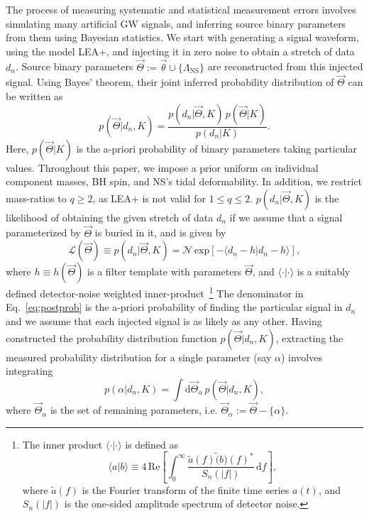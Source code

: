 \documentclass[aps,prd,amsmath,floats,floatfix, twocolumn,
superscriptaddress,nofootinbib,showpacs]{revtex4-1}
\newcommand{\D}{\mathrm{d}}
\newcommand{\lambdans}{\Lambda_\mathrm{NS}}
\newcommand{\LL}{\mathcal{L}}
\begin{document}
The process of measuring systematic and statistical measurement errors
involves simulating many artificial GW signals, and inferring source binary
parameters from them using Bayesian statistics.
We start with generating a signal waveform, using the model LEA+, and injecting
it in zero noise to obtain a stretch of data $d_n$. Source binary parameters
$\vec{\Theta}:=\vec{\theta}\cup\{\lambdans\}$ are reconstructed from this
injected signal. Using Bayes' theorem, their joint inferred probability
distribution of $\vec{\Theta}$ can be written	 as
\begin{equation}\label{eq:postprob}
 p(\vec{\Theta} | d_n, K) = \dfrac{p(d_n|\vec{\Theta}, K)\,p(\vec{\Theta} | K)}{p(d_n|K)}.
\end{equation}
Here, $p(\vec{\Theta} | K)$ is the a-priori probability of binary parameters
taking particular values. Throughout this paper, we impose a prior uniform on
individual component masses, BH spin, and NS's tidal deformability. In
addition, we restrict mass-ratios to $q\geq 2$, as LEA+ is not valid for 
$1\leq q\leq 2$. $p(d_n|\vec{\Theta}, K)$ is the
likelihood of obtaining the given stretch of data $d_n$ if we assume that a
signal parameterized by $\vec{\Theta}$ is buried in it, and is given by
\begin{equation}\label{eq:likelihood}
 \LL(\vec{\Theta}) \equiv p(d_n| \vec{\Theta}, K) = \mathcal{N}\, \mathrm{exp}[- \langle d_n - h | d_n - h\rangle ],
\end{equation}
where $h\equiv h(\vec{\Theta})$ is a filter template with parameters 
$\vec{\Theta}$, and $\langle\cdot|\cdot\rangle$ is a suitably defined
detector-noise weighted inner-product~\footnote{The inner product
$\langle\cdot|\cdot\rangle$  is defined as
\begin{equation}
\langle a|b\rangle \equiv 4\,\mathrm{Re}\left[\int_0^\infty \dfrac{\tilde{a}(f) \tilde(b)(f)^*}{S_n(|f|)}\,\D f\right],
\end{equation}
where $\tilde{a}(f)$ is the Fourier transform of the finite time series $a(t)$,
and $S_n(|f|)$ is the one-sided amplitude spectrum of detector noise.}
The denominator in Eq.~\ref{eq:postprob} is the a-priori probability of finding
the particular signal in $d_n$ and we assume that each injected signal is as
likely as any other. Having constructed the probability distribution function
$p(\vec{\Theta} | d_n, K)$, extracting the measured probability distribution
for a single parameter (say $\alpha$) involves integrating
\begin{equation}\label{eq:marginalize}
 p(\alpha | d_n, K) = \int\D \vec{\Theta}_\alpha\, p(\vec{\Theta} | d_n, K),
\end{equation}
where $\vec{\Theta}_\alpha$ is the set of remaining parameters, i.e.
$\vec{\Theta}_\alpha:=\vec{\Theta} - \{\alpha\}$.
\end{document}
